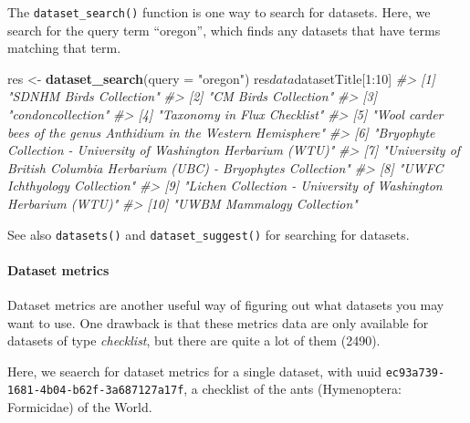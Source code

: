 \documentclass[author-year, review, 11pt]{components/elsarticle} %
\newenvironment{Shaded}{\begin{snugshade}}{\end{snugshade}}
\newcommand{\KeywordTok}[1]{\textcolor[rgb]{0.13,0.29,0.53}{\textbf{{#1}}}}
\newcommand{\DataTypeTok}[1]{\textcolor[rgb]{0.13,0.29,0.53}{{#1}}}
\newcommand{\DecValTok}[1]{\textcolor[rgb]{0.00,0.00,0.81}{{#1}}}
\newcommand{\StringTok}[1]{\textcolor[rgb]{0.31,0.60,0.02}{{#1}}}
\newcommand{\CommentTok}[1]{\textcolor[rgb]{0.56,0.35,0.01}{\textit{{#1}}}}
\newcommand{\NormalTok}[1]{{#1}}
\begin{document}
The \texttt{dataset\_search()} function is one way to search for
datasets. Here, we search for the query term ``oregon'', which finds any
datasets that have terms matching that term.

\begin{Shaded}
\begin{Highlighting}[]
\NormalTok{res <-}\StringTok{ }\KeywordTok{dataset_search}\NormalTok{(}\DataTypeTok{query =} \StringTok{"oregon"}\NormalTok{)}
\NormalTok{res$data$datasetTitle[}\DecValTok{1}\NormalTok{:}\DecValTok{10}\NormalTok{]}
\CommentTok{#>  [1] "SDNHM Birds Collection"                                                }
\CommentTok{#>  [2] "CM Birds Collection"                                                   }
\CommentTok{#>  [3] "condoncollection"                                                      }
\CommentTok{#>  [4] "Taxonomy in Flux Checklist"                                            }
\CommentTok{#>  [5] "Wool carder bees of the genus Anthidium in the Western Hemisphere"     }
\CommentTok{#>  [6] "Bryophyte Collection - University of Washington Herbarium (WTU)"       }
\CommentTok{#>  [7] "University of British Columbia Herbarium (UBC) - Bryophytes Collection"}
\CommentTok{#>  [8] "UWFC Ichthyology Collection"                                           }
\CommentTok{#>  [9] "Lichen Collection - University of Washington Herbarium (WTU)"          }
\CommentTok{#> [10] "UWBM Mammalogy Collection"}
\end{Highlighting}
\end{Shaded}

See also \texttt{datasets()} and \texttt{dataset\_suggest()} for
searching for datasets.

\paragraph{Dataset metrics}\label{dataset-metrics}

Dataset metrics are another useful way of figuring out what datasets you
may want to use. One drawback is that these metrics data are only
available for datasets of type \emph{checklist}, but there are quite a
lot of them (2490).

Here, we seaerch for dataset metrics for a single dataset, with uuid
\texttt{ec93a739-1681-4b04-b62f-3a687127a17f}, a checklist of the ants
(Hymenoptera: Formicidae) of the World.

\begin{Shaded}
\end{Shaded}
\end{document}
